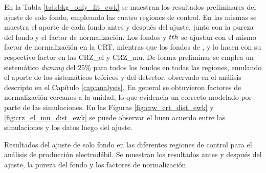 En la Tabla \ref{tab:bkg_only_fit_ewk} se muestran los resultados preliminares del ajuste de solo fondo, empleando las cuatro regiones de control. En las mismas se muestra el aporte de cada fondo antes y después del ajuste, junto con la pureza del fondo y el factor de normalización. Los fondos \ttbarph y $t\bar{t} h$ se ajustan con el mismo factor de normalización en la CRT, mientras que los fondos de \znunuph, \zeeph y \zmumuph lo hacen con su respectivo factor en las CRZ\_el y CRZ\_mu. De forma preliminar se emplea un sistemático \textit{dummy} del $25\%$ para todos los fondos en todas las regiones, emulando el aporte de los sistemáticos teóricos y del detector, observado en el análisis descripto en el Capítulo \ref{cap:analysis}. En general se obtuvieron factores de normalización cercanos a la unidad, lo que evidencia un correcto modelado por parte de las simulaciones. En las Figuras \ref{fig:crw_crt_dist_ewk} y \ref{fig:crz_el_mu_dist_ewk} se puede observar el buen acuerdo entre las simulaciones y los datos luego del ajuste.

\begin{table}
  \centering
  \caption{Resultados del ajuste de solo fondo en las diferentes regiones de control para el análisis de producción electrodébil. Se muestran los resultados antes y después del ajuste, la pureza del fondo y los factores de normalización.}
  \resizebox{\textwidth}{!}{}
  \label{tab:bkg_only_fit_ewk}
\end{table}


